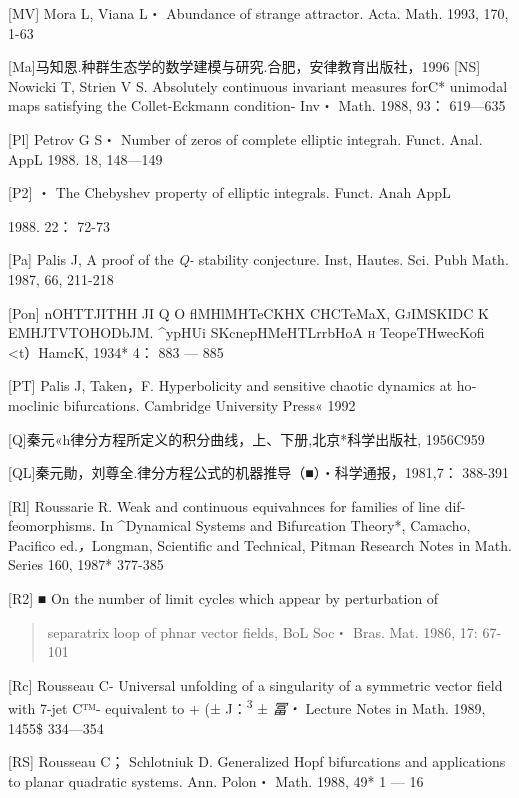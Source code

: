 \documentclass{article}
\begin{document}
{[}MV{]} Mora L, Viana L・ Abundance of strange attractor. Acta. Math.
1993, 170, 1-63

{[}Ma{]}马知恩.种群生态学的数学建模与研究.合肥，安律教育出版社，1996
{[}NS{]} Nowicki T, Strien V S. Absolutely continuous invariant measures
forC* unimodal maps satisfying the Collet-Eckmann condition- Inv・ Math.
1988, 93： 619---635

{[}Pl{]} Petrov G S・ Number of zeros of complete elliptic integrah.
Funct. Anal. AppL 1988. 18, 148---149

{[}P2{]} ・ The Chebyshev property of elliptic integrals. Funct. Anah
AppL

1988. 22： 72-73

{[}Pa{]} Palis J, A proof of the \emph{Q-} stability conjecture. Inst,
Hautes. Sci. Pubh Math. 1987, 66, 211-218

{[}Pon{]} nOHTTJITHH JI Q O flMHlMHTeCKHX CHCTeMaX, \textsc{GjIMSKIDC} K
EMHJTVTOHODbJM. \^{}ypHUi SKcnepHMeHTLrrbHoA \textsc{h} TeopeTHwecKofi
\textless{}t）HamcK, 1934* 4： 883 --- 885

{[}PT{]} Palis J, Taken，F. Hyperbolicity and sensitive chaotic dynamics
at ho­moclinic bifurcations. Cambridge University Press« 1992

{[}Q{]}秦元«h律分方程所定义的积分曲线，上、下册,北京*科学出版社,
1956C959

{[}QL{]}秦元勛，刘尊全.律分方程公式的机器推导（■）・科学通报，1981,7：
388-391

{[}Rl{]} Roussarie R. Weak and continuous equivahnces for families of
line dif- feomorphisms. In \^{}Dynamical Systems and Bifurcation
Theory*, Cama­cho, Pacifico ed.\emph{，}Longman, Scientific and
Technical, Pitman Research Notes in Math. Series 160, 1987* 377-385

{[}R2{]} ■ On the number of limit cycles which appear by perturbation of

\begin{quote}
separatrix loop of phnar vector fields, BoL Soc・ Bras. Mat. 1986, 17:
67-101
\end{quote}

{[}Rc{]} Rousseau C- Universal unfolding of a singularity of a symmetric
vector field with 7-jet C™- equivalent to + (± J：\textsuperscript{3} ±
\emph{冨・} Lecture Notes in Math. 1989, 1455\$ 334---354

{[}RS{]} Rousseau C； Schlotniuk D. Generalized Hopf bifurcations and
applica­tions to planar quadratic systems. Ann. Polon・ Math. 1988, 49*
1 --- 16
\end{document}
